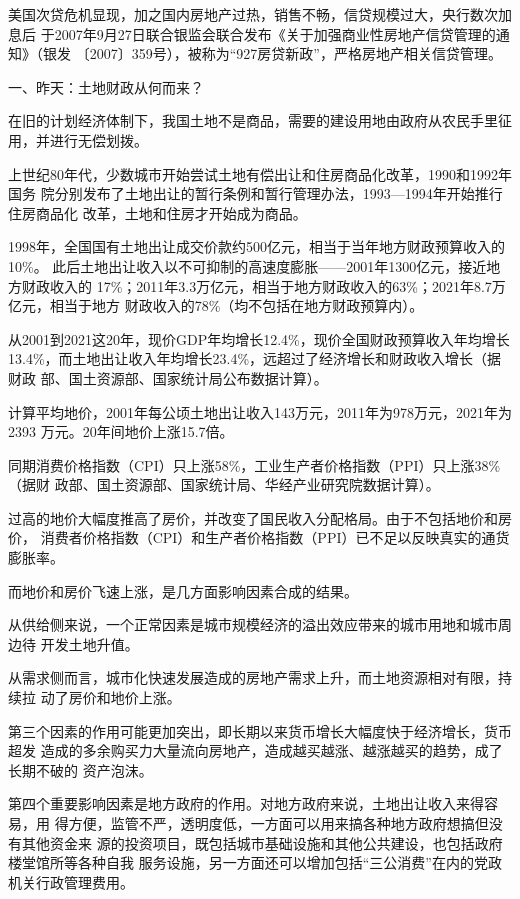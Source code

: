 美国次贷危机显现，加之国内房地产过热，销售不畅，信贷规模过大，央行数次加息后
于2007年9月27日联合银监会联合发布《关于加强商业性房地产信贷管理的通知》（银发
〔2007〕359号），被称为“927房贷新政”，严格房地产相关信贷管理。

 一、昨天：土地财政从何而来？

在旧的计划经济体制下，我国土地不是商品，需要的建设用地由政府从农民手里征用，并进行无偿划拨。

上世纪80年代，少数城市开始尝试土地有偿出让和住房商品化改革，1990和1992年国务
院分别发布了土地出让的暂行条例和暂行管理办法，1993—1994年开始推行住房商品化
改革，土地和住房才开始成为商品。

1998年，全国国有土地出让成交价款约500亿元，相当于当年地方财政预算收入的10\%。
此后土地出让收入以不可抑制的高速度膨胀——2001年1300亿元，接近地方财政收入的
17\%；2011年3.3万亿元，相当于地方财政收入的63\%；2021年8.7万亿元，相当于地方
财政收入的78\%（均不包括在地方财政预算内）。

从2001到2021这20年，现价GDP年均增长12.4\%，现价全国财政预算收入年均增长
13.4\%，而土地出让收入年均增长23.4\%，远超过了经济增长和财政收入增长（据财政
部、国土资源部、国家统计局公布数据计算）。

计算平均地价，2001年每公顷土地出让收入143万元，2011年为978万元，2021年为2393
万元。20年间地价上涨15.7倍。

同期消费价格指数（CPI）只上涨58\%，工业生产者价格指数（PPI）只上涨38\%（据财
政部、国土资源部、国家统计局、华经产业研究院数据计算）。

过高的地价大幅度推高了房价，并改变了国民收入分配格局。由于不包括地价和房价，
消费者价格指数（CPI）和生产者价格指数（PPI）已不足以反映真实的通货膨胀率。

而地价和房价飞速上涨，是几方面影响因素合成的结果。

从供给侧来说，一个正常因素是城市规模经济的溢出效应带来的城市用地和城市周边待
开发土地升值。

从需求侧而言，城市化快速发展造成的房地产需求上升，而土地资源相对有限，持续拉
动了房价和地价上涨。

第三个因素的作用可能更加突出，即长期以来货币增长大幅度快于经济增长，货币超发
造成的多余购买力大量流向房地产，造成越买越涨、越涨越买的趋势，成了长期不破的
资产泡沫。

第四个重要影响因素是地方政府的作用。对地方政府来说，土地出让收入来得容易，用
得方便，监管不严，透明度低，一方面可以用来搞各种地方政府想搞但没有其他资金来
源的投资项目，既包括城市基础设施和其他公共建设，也包括政府楼堂馆所等各种自我
服务设施，另一方面还可以增加包括“三公消费”在内的党政机关行政管理费用。

